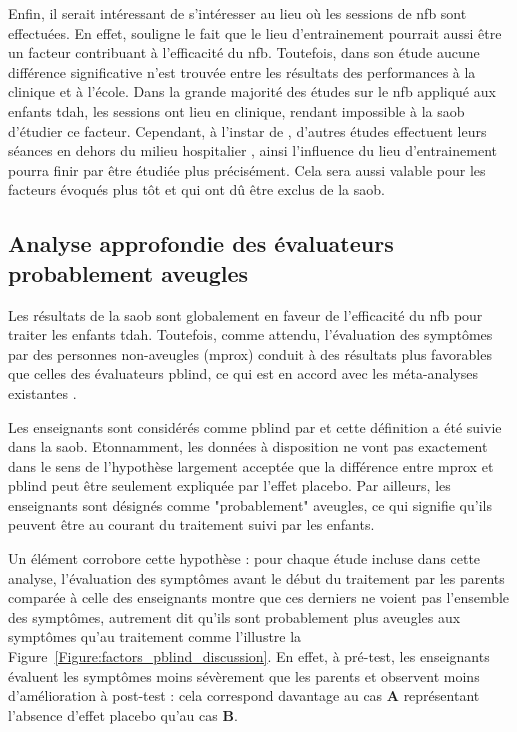 Enfin, il serait intéressant de s'intéresser au lieu où les sessions de \gls{nfb} sont effectuées. En effet, \citet{Minder2018} souligne le fait que le lieu
d'entrainement pourrait aussi être un facteur contribuant à l'efficacité du \gls{nfb}. Toutefois, dans son étude aucune différence significative n'est trouvée entre
les résultats des performances à la clinique et à l'école. Dans la grande majorité des études sur le \gls{nfb} appliqué aux enfants
\gls{tdah}, les sessions ont lieu en clinique, rendant impossible à la \gls{saob} d'étudier ce facteur. Cependant, à l'instar de \citet{Minder2018}, d'autres 
études effectuent leurs séances en dehors du milieu hospitalier \citep{Bioulac2019}, ainsi l'influence du lieu d'entrainement pourra finir par être étudiée
plus précisément. Cela sera aussi valable pour les facteurs évoqués plus tôt et qui ont dû être exclus de la \gls{saob}.

\subsection{Analyse approfondie des évaluateurs probablement aveugles}

Les résultats de la \gls{saob} sont globalement en faveur de l'efficacité du \gls{nfb} pour traiter les enfants \gls{tdah}. Toutefois, comme attendu, l'évaluation
des symptômes par des personnes non-aveugles (\gls{mprox}) conduit à des résultats plus favorables que celles des évaluateurs \gls{pblind}, ce qui est en accord avec les
méta-analyses existantes \citep{Micoulaud2014, Cortese2016}. 

Les enseignants sont considérés comme \gls{pblind} par \citet{Cortese2016, Micoulaud2014} et cette définition a été suivie dans la \gls{saob}. Etonnamment, les données
à disposition ne vont pas exactement dans le sens de l'hypothèse largement acceptée que la différence entre \gls{mprox} et \gls{pblind} peut être seulement 
expliquée par l'effet placebo. Par ailleurs, les enseignants sont désignés comme "probablement" aveugles, ce qui signifie qu'ils peuvent être au courant du
traitement suivi par les enfants. 

Un élément corrobore cette hypothèse : pour chaque étude incluse dans cette analyse, l'évaluation des symptômes avant le début
du traitement par les parents comparée à celle des enseignants montre que ces derniers ne voient pas l'ensemble des symptômes, autrement dit qu'ils sont probablement
plus aveugles aux symptômes qu'au traitement comme l'illustre la Figure~\ref{Figure:factors_pblind_discussion}. En effet, à pré-test, les enseignants évaluent les 
symptômes moins sévèrement que les parents et observent moins d'amélioration à post-test : cela correspond davantage au cas \textbf{A} représentant l'absence d'effet placebo
qu'au cas \textbf{B}.

